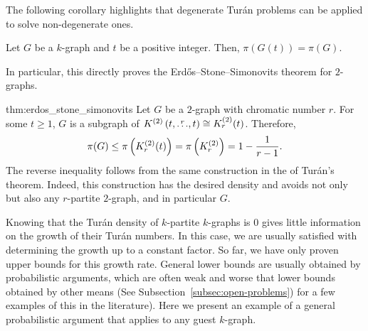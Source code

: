 The following corollary highlights that degenerate Turán problems can be applied to solve non-degenerate ones.
\begin{corollary}
    Let $G$ be a $k$-graph and $t$ be a positive integer.
    Then, $\pi(G(t)) = \pi(G)$.
\end{corollary}

In particular, this directly proves the Erdős--Stone--Simonovits theorem for $2$-graphs.

\begin{delayedproof}{thm:erdos_stone_simonovits}
    Let $G$ be a $2$-graph with chromatic number $r$.
    For some $t \geq 1$, $G$ is a subgraph of
    $K^{(2)}\left(t, \overset{r}{\dots}, t\right) \cong K^{(2)}_{r}(t)$.
    Therefore,
    \[
        \pi(G) \leq \pi\left(K^{(2)}_{r}(t)\right)
        = \pi\left(K^{(2)}_{r}\right) = 1 - \frac{1}{r-1}.
    \]
    The reverse inequality follows from the same construction in the  of Turán's theorem.
    Indeed, this construction has the desired density and avoids not only  but also
    any $r$-partite $2$-graph, and in particular $G$.
\end{delayedproof}


Knowing that the Turán density of $k$-partite $k$-graphs is $0$
gives little information on the growth of their Turán numbers.
In this case, we are usually satisfied with determining the growth up to a constant factor.
So far, we have only proven upper bounds for this growth rate.
General lower bounds are usually obtained by probabilistic arguments,
which are often weak and worse that lower bounds obtained by other means (See Subsection~\ref{subsec:open-problems})
for a few examples of this in the literature).
Here we present an example of a general probabilistic argument that applies to any guest $k$-graph.

